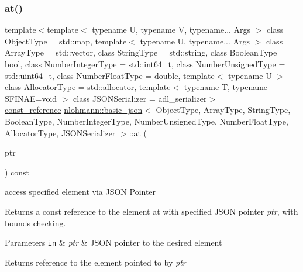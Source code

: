 \subsubsection{\texorpdfstring{at()}{at()}\hspace{0.1cm}{\footnotesize\ttfamily [6/6]}}
{\footnotesize\ttfamily template$<$template$<$ typename U, typename V, typename... Args $>$ class Object\+Type = std\+::map, template$<$ typename U, typename... Args $>$ class Array\+Type = std\+::vector, class String\+Type  = std\+::string, class Boolean\+Type  = bool, class Number\+Integer\+Type  = std\+::int64\+\_\+t, class Number\+Unsigned\+Type  = std\+::uint64\+\_\+t, class Number\+Float\+Type  = double, template$<$ typename U $>$ class Allocator\+Type = std\+::allocator, template$<$ typename T, typename S\+F\+I\+N\+A\+E=void $>$ class J\+S\+O\+N\+Serializer = adl\+\_\+serializer$>$ \\
\mbox{\hyperlink{classnlohmann_1_1basic__json_a4057c5425f4faacfe39a8046871786ca}{const\+\_\+reference}} \mbox{\hyperlink{classnlohmann_1_1basic__json}{nlohmann\+::basic\+\_\+json}}$<$ Object\+Type, Array\+Type, String\+Type, Boolean\+Type, Number\+Integer\+Type, Number\+Unsigned\+Type, Number\+Float\+Type, Allocator\+Type, J\+S\+O\+N\+Serializer $>$\+::at (\begin{DoxyParamCaption}\item[{const \mbox{\hyperlink{classnlohmann_1_1json__pointer}{json\+\_\+pointer}} \&}]{ptr }\end{DoxyParamCaption}) const\hspace{0.3cm}{\ttfamily [inline]}}



access specified element via J\+S\+ON Pointer 

Returns a const reference to the element at with specified J\+S\+ON pointer {\itshape ptr}, with bounds checking.


\begin{DoxyParams}[1]{Parameters}
\mbox{\tt in}  & {\em ptr} & J\+S\+ON pointer to the desired element\\
\hline
\end{DoxyParams}
\begin{DoxyReturn}{Returns}
reference to the element pointed to by {\itshape ptr} 
\end{DoxyReturn}

